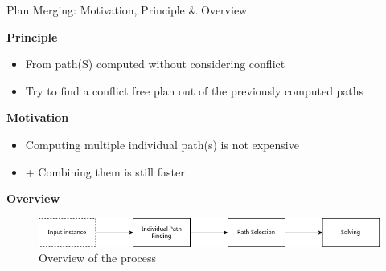 \begin{frame}{Plan Merging: Motivation, Principle \& Overview}


    \textbf{Principle}
    \begin{itemize}
        \item From path(S) computed without considering conflict
        \item Try to find a conflict free plan out of the previously computed paths
    \end{itemize}


    \textbf{Motivation}
    \begin{itemize}
        \item Computing multiple individual path(s) is not expensive
        \item + Combining them is still faster 
    \end{itemize}


    \textbf{Overview}
    \begin{figure}[H]
        \centering
        \caption{Overview of the process}
        \includegraphics[width=\widthimg]{img/overview.drawio.png}
    \end{figure}
\end{frame}


